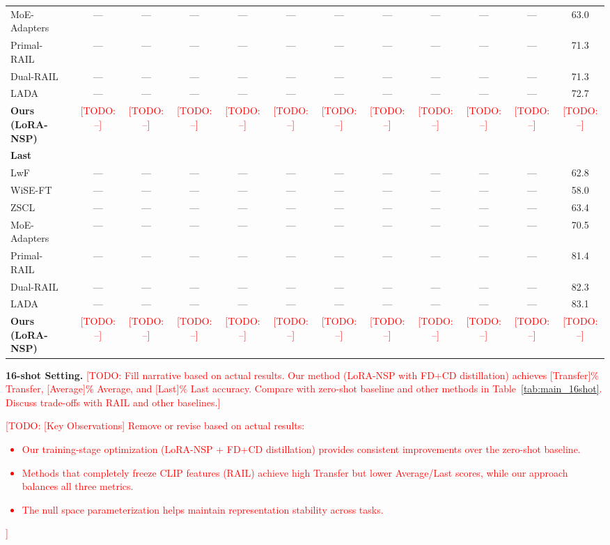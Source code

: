 \documentclass{article}
\newcommand{\todo}[1]{\textcolor{red}{[TODO: #1]}}
\begin{document}
\begin{table}[t]
{\begin{tabular}{l|cccccccccc|c}
MoE-Adapters~\cite{yu2024moe} & --- & --- & --- & --- & --- & --- & --- & --- & --- & --- & 63.0 \\
Primal-RAIL~\cite{xu2024rail} & --- & --- & --- & --- & --- & --- & --- & --- & --- & --- & 71.3 \\
Dual-RAIL~\cite{xu2024rail} & --- & --- & --- & --- & --- & --- & --- & --- & --- & --- & 71.3 \\
LADA~\cite{luo2025lada} & --- & --- & --- & --- & --- & --- & --- & --- & --- & --- & 72.7 \\
\textbf{Ours (LoRA-NSP)} & \todo{--} & \todo{--} & \todo{--} & \todo{--} & \todo{--} & \todo{--} & \todo{--} & \todo{--} & \todo{--} & \todo{--} & \todo{--} \\
\midrule
\multicolumn{12}{l}{\textbf{Last}} \\
LwF~\cite{li2017learning} & --- & --- & --- & --- & --- & --- & --- & --- & --- & --- & 62.8 \\
WiSE-FT~\cite{wortsman2022robust} & --- & --- & --- & --- & --- & --- & --- & --- & --- & --- & 58.0 \\
ZSCL~\cite{zheng2023zscl} & --- & --- & --- & --- & --- & --- & --- & --- & --- & --- & 63.4 \\
MoE-Adapters~\cite{yu2024moe} & --- & --- & --- & --- & --- & --- & --- & --- & --- & --- & 70.5 \\
Primal-RAIL~\cite{xu2024rail} & --- & --- & --- & --- & --- & --- & --- & --- & --- & --- & 81.4 \\
Dual-RAIL~\cite{xu2024rail} & --- & --- & --- & --- & --- & --- & --- & --- & --- & --- & 82.3 \\
LADA~\cite{luo2025lada} & --- & --- & --- & --- & --- & --- & --- & --- & --- & --- & 83.1 \\
\textbf{Ours (LoRA-NSP)} & \todo{--} & \todo{--} & \todo{--} & \todo{--} & \todo{--} & \todo{--} & \todo{--} & \todo{--} & \todo{--} & \todo{--} & \todo{--} \\
\bottomrule
\end{tabular}
}
\end{table}

\textbf{16-shot Setting.}
\todo{Fill narrative based on actual results. Our method (LoRA-NSP with FD+CD distillation) achieves [Transfer]\% Transfer, [Average]\% Average, and [Last]\% Last accuracy. Compare with zero-shot baseline and other methods in Table~\ref{tab:main_16shot}. Discuss trade-offs with RAIL and other baselines.}

\todo{[Key Observations] Remove or revise based on actual results:
\begin{itemize}
    \item Our training-stage optimization (LoRA-NSP + FD+CD distillation) provides consistent improvements over the zero-shot baseline.
    \item Methods that completely freeze CLIP features (RAIL) achieve high Transfer but lower Average/Last scores, while our approach balances all three metrics.
    \item The null space parameterization helps maintain representation stability across tasks.
\end{itemize}
}
\end{document}
